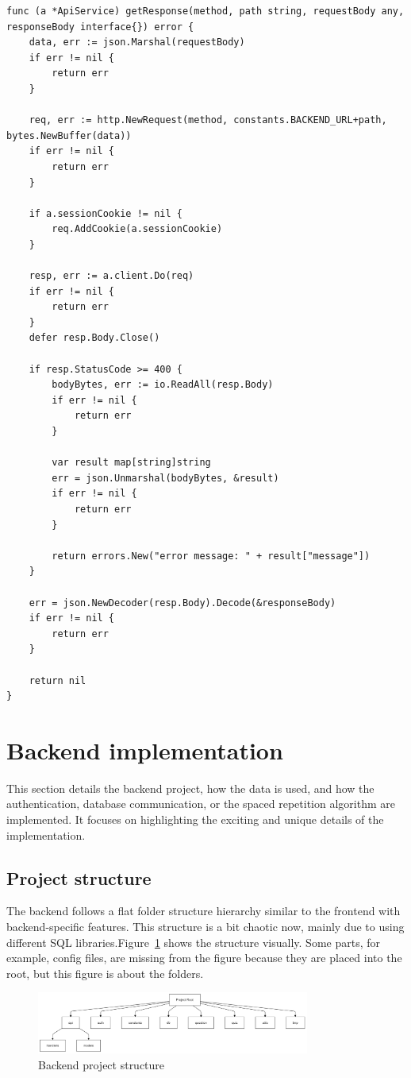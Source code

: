 \begin{lstlisting}[caption=ApiService code,label=lst:api-service]
func (a *ApiService) getResponse(method, path string, requestBody any, responseBody interface{}) error {
	data, err := json.Marshal(requestBody)
	if err != nil {
		return err
	}

	req, err := http.NewRequest(method, constants.BACKEND_URL+path, bytes.NewBuffer(data))
	if err != nil {
		return err
	}

	if a.sessionCookie != nil {
		req.AddCookie(a.sessionCookie)
	}

	resp, err := a.client.Do(req)
	if err != nil {
		return err
	}
	defer resp.Body.Close()

	if resp.StatusCode >= 400 {
		bodyBytes, err := io.ReadAll(resp.Body)
		if err != nil {
			return err
		}

		var result map[string]string
		err = json.Unmarshal(bodyBytes, &result)
		if err != nil {
			return err
		}

		return errors.New("error message: " + result["message"])
	}

	err = json.NewDecoder(resp.Body).Decode(&responseBody)
	if err != nil {
		return err
	}

	return nil
}
\end{lstlisting}

\section{Backend implementation}

 This section details the backend project, how the data is used, and how the authentication, database communication, or the spaced repetition algorithm are implemented. It focuses on highlighting the exciting and unique details of the implementation.

\subsection{Project structure}

The backend follows a flat folder structure hierarchy similar to the frontend with backend-specific features. This structure is a bit chaotic now, mainly due to using different SQL libraries.Figure~\ref{fig:backend-project-structure} shows the structure visually. Some parts, for example, config files, are missing from the figure because they are placed into the root, but this figure is about the folders.

\begin{figure}[H]
	\centering
	\includegraphics[width=0.8\textwidth, keepaspectratio]{figures/backend-project-structure.png}
	\caption{Backend project structure}
	\label{fig:backend-project-structure}
\end{figure}

